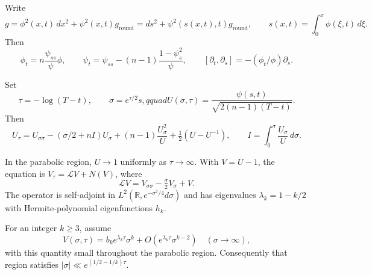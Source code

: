 \begin{definition}
\label{def:chow-iv-rotational-flow-equations}
Write
\[
 g=\phi^2(x,t)\,dx^2+\psi^2(x,t)g_{\mathrm{round}}
 =ds^2+\psi^2(s(x,t),t)g_{\mathrm{round}},\qquad
 s(x,t)=\int_0^x\phi(\xi,t)\,d\xi.
\]
Then
\[
 \phi_t=n\frac{\psi_{ss}}\psi\phi,
 \qquad \psi_t=\psi_{ss}-(n-1)\frac{1-\psi_s^2}{\psi},
 \qquad [\partial_t,\partial_s]=-(\phi_t/\phi)\partial_s.
\]
\end{definition}

\begin{definition}
\label{def:chow-iv-parabolic-rescaling}
Set
\[
 \tau=-\log(T-t),\qquad \sigma=e^{\tau/2}s,qquad
 U(\sigma,\tau)=\frac{\psi(s,t)}{\sqrt{2(n-1)(T-t)}}.
\]
Then
\[
 U_\tau=U_{\sigma\sigma}-(\sigma/2+nI)U_\sigma
 +(n-1)\frac{U_\sigma^2}{U}+\tfrac12(U-U^{-1}),
 \qquad I=\int_0^\sigma\frac{U_\sigma}{U}\,d\sigma.
\]
\end{definition}

\begin{definition}
\label{def:chow-iv-parabolic-linearization}
In the parabolic region, $U\to1$ uniformly as $\tau\to\infty$.  With
$V=U-1$, the equation is $V_\tau=\mathcal LV+N(V)$, where
\[
 \mathcal LV=V_{\sigma\sigma}-\tfrac\sigma2V_\sigma+V.
\]
The operator is self-adjoint in
$L^2(\mathbb R,e^{-\sigma^2/4}d\sigma)$ and has eigenvalues
$\lambda_k=1-k/2$ with Hermite-polynomial eigenfunctions $h_k$.
\end{definition}

\begin{definition}
\label{def:chow-iv-parabolic-leading-mode}
For an integer $k\ge3$, assume
\[
 V(\sigma,\tau)=b_ke^{\lambda_k\tau}\sigma^k
 +O(e^{\lambda_k\tau}\sigma^{k-2})
 \quad(\sigma\to\infty),
\]
with this quantity small throughout the parabolic region.  Consequently that
region satisfies $|\sigma|\ll e^{(1/2-1/k)\tau}$.
\end{definition}

